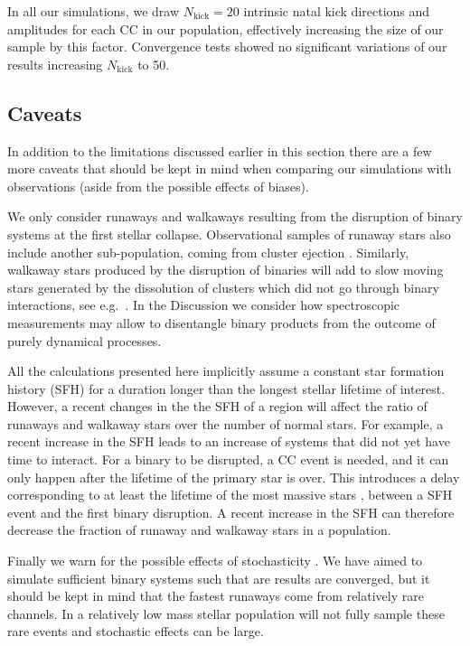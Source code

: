 \documentclass{aa}
\begin{document}
In all our simulations, we draw $N_\mathrm{kick}=20$ intrinsic natal
kick directions and amplitudes for each CC in our population, effectively increasing the size of our sample by this
factor. Convergence tests showed no significant variations
of our results increasing $N_\mathrm{kick}$ to 50.

\subsection{Caveats}
\label{sec:caveats}
In addition to the limitations discussed  earlier in this section there are a few more caveats that should be kept in mind when comparing our simulations with observations (aside from the possible effects of biases). 

We only consider runaways and walkaways resulting from the disruption of binary systems at the first stellar collapse. Observational samples of runaway stars also include another sub-population, coming from cluster ejection \citep[e.g.,][]{poveda:67, leonard:91, fujii:11,  allison:12, perets:12, banerjee:12, oh:16}.  Similarly, walkaway stars produced by the disruption of binaries will add to slow moving stars generated by the dissolution of clusters which did not go through binary interactions, see e.g.~\cite{allison:12}. In the Discussion we consider how spectroscopic measurements may allow to disentangle binary products from the outcome of purely dynamical processes.
   
All the calculations presented here implicitly assume a constant star formation history (SFH) for a duration longer than the longest stellar lifetime of interest.  However, a recent changes in the the SFH of a region will affect the ratio of runaways and walkaway stars over the number of normal stars.  For example, a recent increase in the SFH leads to an increase of systems that did not yet have time to interact. For a binary to be disrupted, a CC event is needed, and it can only happen after the lifetime of the primary star is over. This  introduces a delay corresponding to at least the lifetime of the most massive stars \citep[$\sim$3\,Myr,][]{zapartas:17}, between a SFH event and the first binary disruption.  A recent increase in the SFH can therefore decrease the fraction of runaway and walkaway stars in a population. 

Finally we warn for the possible effects of stochasticity \citep[][]{eldridge:12}.  We have aimed to simulate sufficient binary systems such that are results are converged, but it should  be kept in mind that the fastest runaways come from relatively rare channels. In a relatively low mass stellar population will not fully sample these rare events and stochastic effects can be large. 
\end{document}
